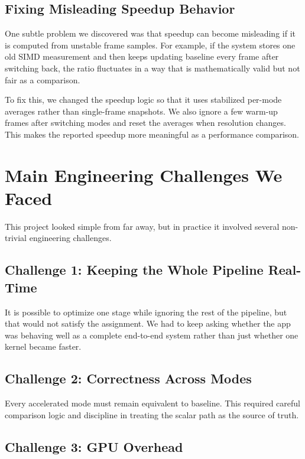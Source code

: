 \documentclass[12pt,a4paper]{article}
\begin{document}
\subsection{Fixing Misleading Speedup Behavior}

One subtle problem we discovered was that speedup can become misleading if it is computed from unstable frame samples. For example, if the system stores one old SIMD measurement and then keeps updating baseline every frame after switching back, the ratio fluctuates in a way that is mathematically valid but not fair as a comparison.

To fix this, we changed the speedup logic so that it uses stabilized per-mode averages rather than single-frame snapshots. We also ignore a few warm-up frames after switching modes and reset the averages when resolution changes. This makes the reported speedup more meaningful as a performance comparison.

\section{Main Engineering Challenges We Faced}

This project looked simple from far away, but in practice it involved several non-trivial engineering challenges.

\subsection{Challenge 1: Keeping the Whole Pipeline Real-Time}

It is possible to optimize one stage while ignoring the rest of the pipeline, but that would not satisfy the assignment. We had to keep asking whether the app was behaving well as a complete end-to-end system rather than just whether one kernel became faster.

\subsection{Challenge 2: Correctness Across Modes}

Every accelerated mode must remain equivalent to baseline. This required careful comparison logic and discipline in treating the scalar path as the source of truth.

\subsection{Challenge 3: GPU Overhead}
\end{document}
